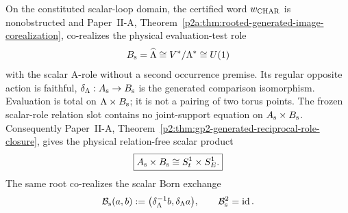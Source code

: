 \documentclass[12pt,a4paper]{article}
\begin{document}
\begin{theorem}
\label{p3a:thm:g0-derived-scalar-character-role}
On the constituted scalar-loop domain, the certified word
\(w_{\rm CHAR}\) is nonobstructed and Paper~II-A,
Theorem~\ref{p2a:thm:rooted-generated-image-corealization}, co-realizes the
physical evaluation-test role
\[
 B_{\rm s}=\widehat\Lambda\cong V^*/\Lambda^*\cong U(1)
\]
with the scalar A-role without a second occurrence premise.  Its regular
opposite action is faithful, \(\delta_\Lambda:A_{\rm s}\to B_{\rm s}\) is
the generated comparison isomorphism. Evaluation is total on
\(\Lambda\times B_{\rm s}\); it is not a pairing of two torus points.
The frozen scalar-role relation slot contains no joint-support equation on
\(A_{\rm s}\times B_{\rm s}\).
Consequently Paper~II-A,
Theorem~\ref{p2:thm:gp2-generated-reciprocal-role-closure}, gives the physical
relation-free scalar product
\[
 \boxed{A_{\rm s}\times B_{\rm s}\cong S^1_t\times S^1_E.}
\]
The same root co-realizes the scalar Born exchange
\[
 \mathcal B_{\rm s}(a,b)
 :=\bigl(\delta_\Lambda^{-1}b,\delta_\Lambda a\bigr),
 \qquad
 \mathcal B_{\rm s}^2=\operatorname{id}.
\]
\end{theorem}
\end{document}

